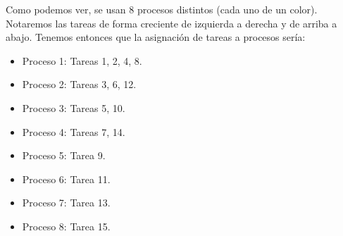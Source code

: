 \begin{ejercicio}
\begin{enumerate}
        Como podemos ver, se usan 8 procesos distintos (cada uno de un color).
        Notaremos las tareas de forma creciente de izquierda a derecha y de arriba a abajo.
        Tenemos entonces que la asignación de tareas a procesos sería:
        \begin{itemize}
            \item \colorbox{red!60}{Proceso 1}: Tareas 1, 2, 4, 8.
            \item \colorbox{blue!60}{Proceso 2}: Tareas 3, 6, 12.
            \item \colorbox{teal!60}{Proceso 3}: Tareas 5, 10.
            \item \colorbox{green!60}{Proceso 4}: Tareas 7, 14.
            \item \colorbox{yellow!60}{Proceso 5}: Tarea 9.
            \item \colorbox{orange!60}{Proceso 6}: Tarea 11.
            \item \colorbox{purple!60}{Proceso 7}: Tarea 13.
            \item \colorbox{violet!60}{Proceso 8}: Tarea 15.
        \end{itemize}        
    \end{enumerate}


\end{ejercicio}
